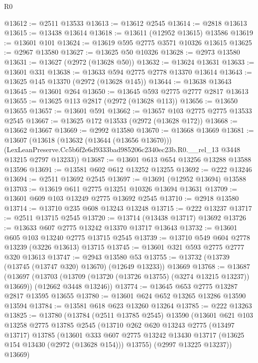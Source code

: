 \begin{lexlean}{R0}
\begin{coremodule}
@13612 := @2511 @13533
@13613 := @13612 @2545
@13614 := @2818 @13613
@13615 := @13438 @13614
@13618 := @13611 (@12952 @13615) @13586
@13619 := @13601 @101
@13624 := @13619 @595 @2775 @3571 @10326 @13615
@13625 := @2967 @13580
@13627 := @13625 @50 @10326
@13628 := @2973 @13580
@13631 := @13627 (@2972 (@13628 @50))
@13632 := @13624 @13631
@13633 := @13601 @331
@13638 := @13633 @594 @2775 @2778 @13370 @13614
@13643 := @13625 @145 @13370 (@2972 (@13628 @145))
@13644 := @13638 @13643
@13645 := @13601 @264
@13650 := @13645 @593 @2775 @2777 @2817 @13613
@13655 := @13625 @113 @2817 (@2972 (@13628 @113))
@13656 := @13650 @13655
@13657 := @13601 @591
@13662 := @13657 @103 @2775 @2775 @13533 @2545
@13667 := @13625 @172 @13533 (@2972 (@13628 @172))
@13668 := @13662 @13667
@13669 := @2992 @13580
@13670 := @13668 @13669
@13681 := @13607
    (@13618
      (@13632 (@13644 (@13656 @13670)))
      (LexLeanPreserve.Cc5b6f2e6d9333bad985206c2340ec23b.R0.__rel_13 @3448 @13215 @2797 @13233))
@13687 := @13601 @613 @654 @13256 @13288 @13588 @13596
@13691 := @13581 @602 @612 @13252 @13255
@13692 := @222 @13246
@13694 := @2511 @13692 @2545
@13697 := @13691 (@12952 @13694) @13588
@13703 := @13619 @611 @2775 @13251 @10326 @13694 @13631
@13709 := @13601 @609 @103 @13249 @2775 @13692 @2545
@13710 := @2918 @13580
@13714 := @13710 @235 @608 @13243 @13248
@13715 := @222 @13237
@13717 := @2511 @13715 @2545
@13720 := @13714 (@13438 @13717) @13692
@13726 := @13633 @607 @2775 @13242 @13370 @13717 @13643
@13732 := @13601 @605 @103 @13240 @2775 @13715 @2545
@13739 := @13710 @549 @604 @2778 @13239 (@3226 @13613) @13715
@13745 := @13601 @321 @593 @2775 @2777 @320 @13613
@13747 := @2943 @13580 @53
@13755 := @13732 (@13739 (@13745 (@13747 @320) @13670) (@12649 @13233)) @13669
@13768 := @13687
    (@13697
      (@13703 (@13709 (@13720 (@13726 @13755) (@3274 @13215 @13237)) @13669))
      (@12662 @3448 @13246))
@13774 := @13645 @653 @2775 @13287 @2817 @13595 @13655
@13780 := @13601 @624 @652 @13265 @13286 @13590 @13594
@13784 := @13581 @618 @623 @13260 @13264
@13785 := @222 @13263
@13825 := @13780
    (@13784
      (@2511 @13785 @2545)
      @13590
      (@13601
        @621
        @103
        @13258
        @2775
        @13785
        @2545
        (@13710
          @262
          @620
          @13243
          @2775
          (@13497 @13717)
          @13785
          (@13601
            @333
            @607
            @2775
            @13242
            @13430
            @13717
            (@13625 @154 @13430 (@2972 (@13628 @154)))
            @13755)
          (@2997 @13225 @13237))
        @13669)

\end{coremodule}
\end{lexlean}
